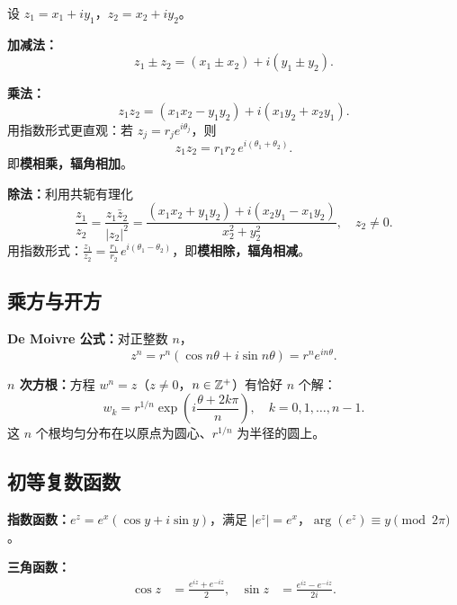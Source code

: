 设 $z_1=x_1+iy_1$，$z_2=x_2+iy_2$。

\textbf{加减法：}
\begin{equation}
  z_1\pm z_2 = (x_1\pm x_2) + i(y_1\pm y_2).
  \label{eq:add}
\end{equation}

\textbf{乘法：}
\begin{equation}
  z_1 z_2 = (x_1 x_2 - y_1 y_2) + i(x_1 y_2 + x_2 y_1).
  \label{eq:mul}
\end{equation}
用指数形式更直观：若 $z_j=r_j e^{i\theta_j}$，则
\begin{equation}
  z_1 z_2 = r_1 r_2\,e^{i(\theta_1+\theta_2)}.
  \label{eq:mul_exp}
\end{equation}
即\textbf{模相乘，辐角相加}。

\textbf{除法：}利用共轭有理化
\begin{equation}
  \frac{z_1}{z_2} = \frac{z_1\bar{z}_2}{|z_2|^2}
  = \frac{(x_1 x_2+y_1 y_2)+i(x_2 y_1-x_1 y_2)}{x_2^2+y_2^2},
  \quad z_2\ne0.
  \label{eq:div}
\end{equation}
用指数形式：$\frac{z_1}{z_2}=\frac{r_1}{r_2}\,e^{i(\theta_1-\theta_2)}$，即\textbf{模相除，辐角相减}。

\subsection{乘方与开方}

\textbf{De Moivre 公式：}对正整数 $n$，
\begin{equation}
  z^n = r^n(\cos n\theta + i\sin n\theta) = r^n e^{in\theta}.
  \label{eq:demoivre}
\end{equation}

\textbf{$n$ 次方根：}方程 $w^n=z$（$z\ne0$，$n\in\mathbb{Z}^+$）有恰好 $n$ 个解：
\begin{equation}
  w_k = r^{1/n}\exp\!\left(i\frac{\theta+2k\pi}{n}\right),
  \quad k=0,1,\ldots,n-1.
  \label{eq:nthroot}
\end{equation}
这 $n$ 个根均匀分布在以原点为圆心、$r^{1/n}$ 为半径的圆上。

\subsection{初等复数函数}

\textbf{指数函数：}$e^z=e^x(\cos y+i\sin y)$，满足 $|e^z|=e^x$，$\arg(e^z) \equiv y \pmod{2\pi}$。

\textbf{三角函数：}
\begin{align}
  \cos z &= \frac{e^{iz}+e^{-iz}}{2}, &
  \sin z &= \frac{e^{iz}-e^{-iz}}{2i}.
  \label{eq:trig}
\end{align}

